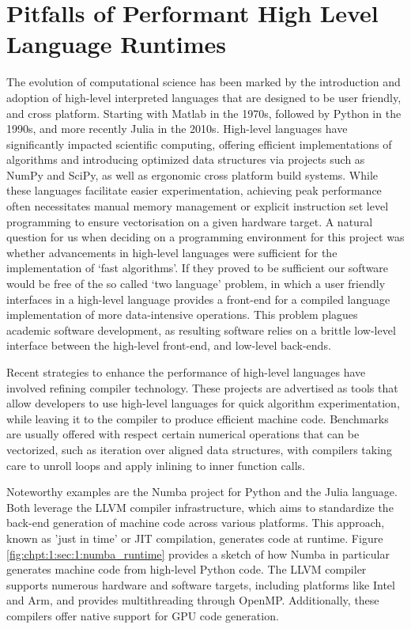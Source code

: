 \section{Pitfalls of Performant High Level Language Runtimes}\label{chpt:1:sec:1}

The evolution of computational science has been marked by the introduction and adoption of high-level interpreted languages that are designed to be user friendly, and cross platform. Starting with Matlab in the 1970s, followed by Python in the 1990s, and more recently Julia in the 2010s. High-level languages have significantly impacted scientific computing, offering efficient implementations of algorithms and introducing optimized data structures via projects such as NumPy and SciPy, as well as ergonomic cross platform build systems. While these languages facilitate easier experimentation, achieving peak performance often necessitates manual memory management or explicit instruction set level programming to ensure vectorisation on a given hardware target. A natural question for us when deciding on a programming environment for this project was whether advancements in high-level languages were sufficient for the implementation of `fast algorithms'. If they proved to be sufficient our software would be free of the so called `two language' problem, in which a user friendly interfaces in a high-level language provides a front-end for a compiled language implementation of more data-intensive operations. This problem plagues academic software development, as resulting software relies on a brittle low-level interface between the high-level front-end, and low-level back-ends.

Recent strategies to enhance the performance of high-level languages have involved refining compiler technology. These projects are advertised as tools that allow developers to use high-level languages for quick algorithm experimentation, while leaving it to the compiler to produce efficient machine code. Benchmarks are usually offered with respect certain numerical operations that can be vectorized, such as iteration over aligned data structures, with compilers taking care to unroll loops and apply inlining to inner function calls.

Noteworthy examples are the Numba project for Python and the Julia language. Both leverage the LLVM compiler infrastructure, which aims to standardize the back-end generation of machine code across various platforms. This approach, known as 'just in time' or JIT compilation, generates code at runtime. Figure \ref{fig:chpt:1:sec:1:numba_runtime} provides a sketch of how Numba in particular generates machine code from high-level Python code. The LLVM compiler supports numerous hardware and software targets, including platforms like Intel and Arm, and provides multithreading through OpenMP. Additionally, these compilers offer native support for GPU code generation.

